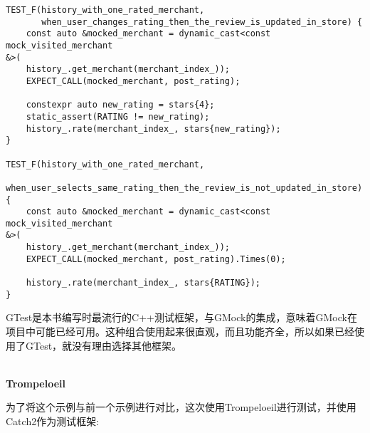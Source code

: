\begin{lstlisting}[style=styleCXX]
TEST_F(history_with_one_rated_merchant,
	   when_user_changes_rating_then_the_review_is_updated_in_store) {
	const auto &mocked_merchant = dynamic_cast<const mock_visited_merchant
&>(
	history_.get_merchant(merchant_index_));
	EXPECT_CALL(mocked_merchant, post_rating);
	
	constexpr auto new_rating = stars{4};
	static_assert(RATING != new_rating);
	history_.rate(merchant_index_, stars{new_rating});
}

TEST_F(history_with_one_rated_merchant,
	   when_user_selects_same_rating_then_the_review_is_not_updated_in_store) {
	const auto &mocked_merchant = dynamic_cast<const mock_visited_merchant
&>(
	history_.get_merchant(merchant_index_));
	EXPECT_CALL(mocked_merchant, post_rating).Times(0);
	
	history_.rate(merchant_index_, stars{RATING});
}
\end{lstlisting}

GTest是本书编写时最流行的C++测试框架，与GMock的集成，意味着GMock在项目中可能已经可用。这种组合使用起来很直观，而且功能齐全，所以如果已经使用了GTest，就没有理由选择其他框架。

\hspace*{\fill} \\ %
\noindent
\textbf{Trompeloeil}

为了将这个示例与前一个示例进行对比，这次使用Trompeloeil进行测试，并使用Catch2作为测试框架:

